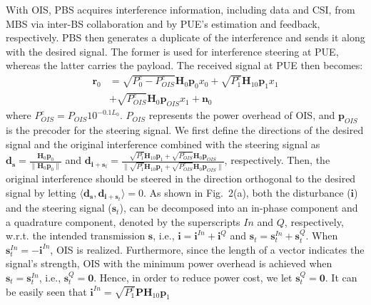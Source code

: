 \documentclass[10pt, conference, letterpaper]{IEEEtran}
\begin{document}
With OIS, PBS acquires interference information, including data and CSI,
from MBS via inter-BS collaboration and by PUE's estimation and feedback, respectively.
PBS then generates a duplicate of the interference and sends it along with the desired signal.
The former is used for interference steering at PUE,
whereas the latter carries the payload.
The received signal at PUE then becomes:
\begin{equation}
\begin{aligned}
\mathbf{r}_{0}&=\sqrt{P^{e}_{0}-P^{e}_{OIS}}\mathbf{H}_{0}\mathbf{p}_{0}{x}_{0}
+\sqrt{P^{e}_{1}}\mathbf{H}_{10}\mathbf{p}_{1}x_{1}\\
&+\sqrt{P^{e}_{OIS}}\mathbf{H}_{0}\mathbf{p}_{OIS}x_{1}+\mathbf{n}_{0}
\end{aligned}
\end{equation}
where $P^{e}_{OIS}=P_{OIS}10^{-0.1L_{0}}$.
$P_{OIS}$ represents the power overhead of OIS,
and $\mathbf{p}_{OIS}$ is the precoder for the steering signal.
We first define the directions of the desired signal and
the original interference combined with the steering signal as
$\mathbf{d}_{\mathbf{s}}=\frac{\mathbf{H}_{0}\mathbf{p}_{0}}{\|\mathbf{H}_{0}\mathbf{p}_{0}\|}$ and
$\mathbf{d}_{\mathbf{i}+\mathbf{s}_{t}}=\frac{\sqrt{P^{e}_{1}}\mathbf{H}_{10}\mathbf{p}_{1}+\sqrt{P^{e}_{OIS}}
\mathbf{H}_{0}\mathbf{p}_{OIS}}{\|\sqrt{P^{e}_{1}}\mathbf{H}_{10}\mathbf{p}_{1}+\sqrt{P^{e}_{OIS}}
\mathbf{H}_{0}\mathbf{p}_{OIS}\|}$, respectively.
Then, the original interference should be steered in the direction orthogonal to the desired signal
by letting $\langle\mathbf{d}_{\mathbf{s}},\mathbf{d}_{\mathbf{i}+\mathbf{s}_{t}}\rangle=0$.
As shown in Fig.~2(a), both the disturbance ($\mathbf{i}$) and
the steering signal ($\mathbf{s}_{t}$),
can be decomposed into an in-phase component and a quadrature component,
denoted by the superscripts $In$ and $Q$, respectively,
w.r.t. the intended transmission $\mathbf{s}$,
i.e., $\mathbf{i}=\mathbf{i}^{In}+\mathbf{i}^{Q}$ and $\mathbf{s}_{t}=\mathbf{s}^{In}_{t}+\mathbf{s}^{Q}_{t}$.
When $\mathbf{s}^{In}_{t}=-\mathbf{i}^{In}$, OIS is realized.
Furthermore, since the length of a vector indicates the signal's strength, OIS with the minimum power
overhead is achieved when $\mathbf{s}_{t}=\mathbf{s}^{In}_{t}$, i.e., $\mathbf{s}^{Q}_{t}=\mathbf{0}$.
Hence, in order to reduce power cost, we let $\mathbf{s}^{Q}_{t}=\mathbf{0}$.
It can be easily seen that $\mathbf{i}^{In}=\sqrt{P^{e}_{1}}\mathbf{P}\mathbf{H}_{10}\mathbf{p}_{1}$
\end{document}
